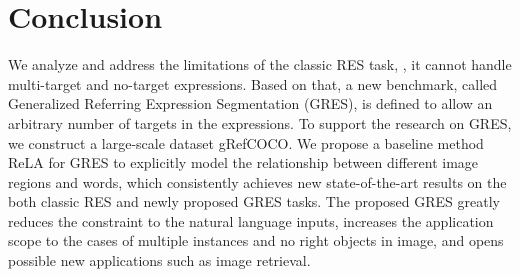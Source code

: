 \documentclass[10pt,twocolumn,letterpaper]{article}
\begin{document}
\section{Conclusion}

We analyze and address the limitations of the classic RES task, \ie, it cannot handle multi-target and no-target expressions. Based on that, a new benchmark, called Generalized Referring Expression Segmentation (GRES), is defined to allow an arbitrary number of targets in the expressions. To support the research on GRES, we construct a large-scale dataset gRefCOCO. We propose a baseline method ReLA for GRES to explicitly model the relationship between different image regions and words, which consistently achieves new state-of-the-art results on the both classic RES and newly proposed GRES tasks.
The proposed GRES greatly reduces the constraint to the natural language inputs, increases the application scope to the cases of multiple instances and no right objects in image, and opens possible new applications such as image retrieval.


{\small


}
\end{document}
